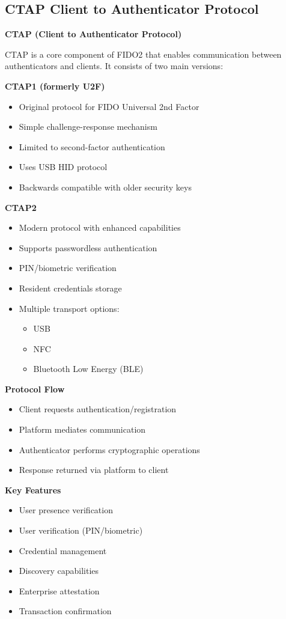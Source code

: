 \subsection{CTAP Client to Authenticator Protocol}
\textbf{CTAP (Client to Authenticator Protocol)}

CTAP is a core component of FIDO2 that enables communication between authenticators and clients. It consists of two main versions:

\textbf{CTAP1 (formerly U2F)}
\begin{itemize}
    \item Original protocol for FIDO Universal 2nd Factor
    \item Simple challenge-response mechanism
    \item Limited to second-factor authentication
    \item Uses USB HID protocol
    \item Backwards compatible with older security keys
\end{itemize}

\textbf{CTAP2}
\begin{itemize}
    \item Modern protocol with enhanced capabilities
    \item Supports passwordless authentication
    \item PIN/biometric verification
    \item Resident credentials storage
    \item Multiple transport options:
        \begin{itemize}
            \item USB
            \item NFC
            \item Bluetooth Low Energy (BLE)
        \end{itemize}
\end{itemize}

\textbf{Protocol Flow}
\begin{itemize}
    \item Client requests authentication/registration
    \item Platform mediates communication
    \item Authenticator performs cryptographic operations
    \item Response returned via platform to client
\end{itemize}

\textbf{Key Features}
\begin{itemize}
    \item User presence verification
    \item User verification (PIN/biometric)
    \item Credential management
    \item Discovery capabilities
    \item Enterprise attestation
    \item Transaction confirmation
\end{itemize}

